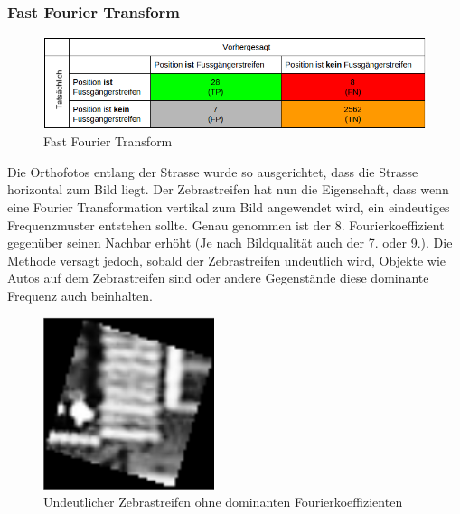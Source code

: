 \subsubsection{Fast Fourier Transform}	
\begin{figure}[H]
\includegraphics[width=\textwidth]{images/fast_fourier_conf.png}
\caption[Fast Fourier Transform]{Fast Fourier Transform}
\end{figure}
Die \Gls{Orthofotos} entlang der Strasse wurde so ausgerichtet, dass die Strasse horizontal zum Bild liegt. Der Zebrastreifen hat nun die Eigenschaft, dass wenn eine Fourier Transformation vertikal zum Bild angewendet wird, ein eindeutiges Frequenzmuster entstehen sollte. Genau genommen ist der 8. Fourierkoeffizient gegenüber seinen Nachbar erhöht (Je nach Bildqualität auch der 7. oder 9.).
Die Methode versagt jedoch, sobald der Zebrastreifen undeutlich wird, Objekte wie Autos auf dem Zebrastreifen sind oder andere Gegenstände diese dominante Frequenz auch beinhalten.\\
\begin{figure}[H]
	\centering
	\includegraphics[width=5cm]{images/Unsharp_Crosswalk2.png}\caption[Scale-invariant Feature Transform]{Undeutlicher Zebrastreifen ohne dominanten Fourierkoeffizienten}
\end{figure}
\newpage
